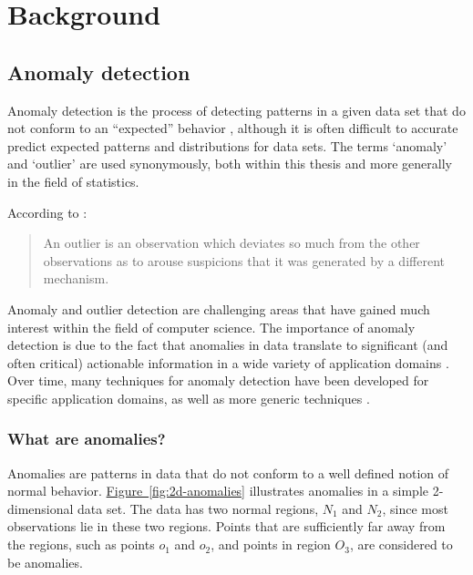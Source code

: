 \chapter{Background}
\label{ch:background}

\section{Anomaly detection}
\label{sec:anomalyDetection}
Anomaly detection is the process of detecting patterns in a given data set that 
do not conform to an ``expected'' behavior \cite{Chandola:2007}, although it is
often difficult to accurate predict expected patterns and distributions for data
sets. The terms `anomaly' and `outlier' are used synonymously, both within this 
thesis and more generally in the field of statistics.

According to \citeauthor{Hawkins:1980} \cite{Hawkins:1980}:
\begin{quote}
An outlier is an observation which deviates so much from the other observations 
as to arouse suspicions that it was generated by a different mechanism.
\end{quote}

Anomaly and outlier detection are challenging areas that have gained much 
interest within the field of computer science. The importance of anomaly 
detection is due to the fact that anomalies in data translate to significant 
(and often critical) actionable information in a wide variety of application 
domains \cite{Chandola:2007}. Over time, many techniques for anomaly 
detection have been developed for specific application domains, as well as more 
generic techniques \cite{Chandola:2007}.

\subsection{What are anomalies?}
\label{sec:whatAreAnomalies}
Anomalies are patterns in data that do not conform to a well defined notion of
normal behavior. \hyperref[fig:2d-anomalies]{Figure~\ref{fig:2d-anomalies}} 
illustrates anomalies in a simple 2-dimensional data set. The data has two 
normal regions, $N_{1}$ and $N_{2}$, since most observations lie in these two 
regions. Points that are sufficiently far away from the regions, such as points 
$o_{1}$ and $o_{2}$, and points in region $O_{3}$, are considered to be 
anomalies.


